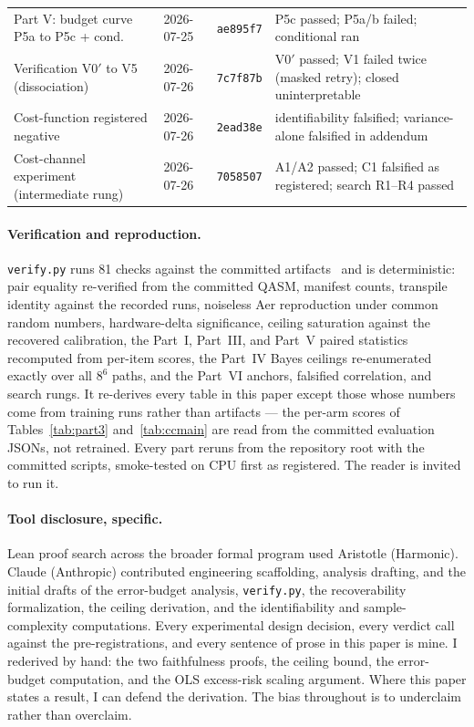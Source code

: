 \begin{table}[htbp]
\begin{tabular}{@{}lll >{\raggedright\arraybackslash}p{5.2cm}@{}}
Part V: budget curve P5a to P5c + cond. & 2026-07-25 & \texttt{ae895f7} & P5c passed; P5a/b failed; conditional ran \\
Verification V0$'$ to V5 (dissociation) & 2026-07-26 & \texttt{7c7f87b} & V0$'$ passed; V1 failed twice (masked retry); closed uninterpretable \\
Cost-function registered negative & 2026-07-26 & \texttt{2ead38e} & identifiability falsified; variance-alone falsified in addendum \\
Cost-channel experiment (intermediate rung) & 2026-07-26 & \texttt{7058507} & A1/A2 passed; C1 falsified as registered; search R1--R4 passed \\
\bottomrule
\end{tabular}
\end{table}

\paragraph{Verification and reproduction.} \texttt{verify.py} runs 81 checks against the committed artifacts~\cite{appliedrepo2026} and is deterministic: pair equality re-verified from the committed QASM, manifest counts, transpile identity against the recorded runs, noiseless Aer reproduction under common random numbers, hardware-delta significance, ceiling saturation against the recovered calibration, the Part~I, Part~III, and Part~V paired statistics recomputed from per-item scores, the Part~IV Bayes ceilings re-enumerated exactly over all $8^6$ paths, and the Part~VI anchors, falsified correlation, and search rungs. It re-derives every table in this paper except those whose numbers come from training runs rather than artifacts --- the per-arm scores of Tables~\ref{tab:part3} and~\ref{tab:ccmain} are read from the committed evaluation JSONs, not retrained. Every part reruns from the repository root with the committed scripts, smoke-tested on CPU first as registered. The reader is invited to run it.

\paragraph{Tool disclosure, specific.} Lean proof search across the broader formal program used Aristotle (Harmonic). Claude (Anthropic) contributed engineering scaffolding, analysis drafting, and the initial drafts of the error-budget analysis, \texttt{verify.py}, the recoverability formalization, the ceiling derivation, and the identifiability and sample-complexity computations. Every experimental design decision, every verdict call against the pre-registrations, and every sentence of prose in this paper is mine. I rederived by hand: the two faithfulness proofs, the ceiling bound, the error-budget computation, and the OLS excess-risk scaling argument. Where this paper states a result, I can defend the derivation. The bias throughout is to underclaim rather than overclaim.

